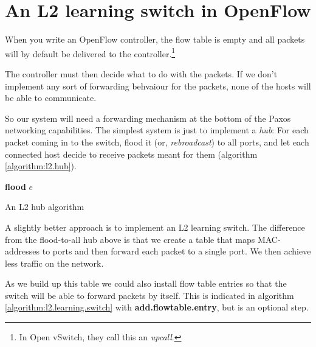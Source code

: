 \section{An L2 learning switch in OpenFlow}
\label{chapter:l2.learning.switch}

When you write an OpenFlow controller, the flow table is empty and all
packets will by default be delivered to the controller.\footnote{In Open
vSwitch, they call this an \textit{upcall}.}

The controller must then decide what to do with the packets.  If we don't
implement any sort of forwarding behvaiour for the packets, none of the
hosts will be able to communicate.

So our system will need a forwarding mechanism at the bottom of the Paxos
networking capabilities.  The simplest system is just to implement a
\textit{hub}:  For each packet coming in to the switch, flood it
(or, \textit{rebroadcast}) to all ports, and let each
connected host decide to receive packets meant for them (algorithm
\ref{algorithm:l2.hub}).

\begin{algorithm}
  \begin{algorithmic}
      \State \textbf{flood} $e$ 
    \EndOn
  \end{algorithmic}
  \caption{An L2 hub algorithm}
  \label{algorithm:l2.hub}
\end{algorithm}

A slightly better approach is to implement an \ac{L2} learning
switch.
The difference from the flood-to-all hub above is that we create a table
that maps MAC-addresses to ports and then forward each packet to a single
port.  We then achieve less traffic on the network.

As we build up this table we could also install flow table entries so that the
switch will be able to forward packets by itself.  This is indicated in
algorithm \vref{algorithm:l2.learning.switch} with
\textbf{add.flowtable.entry}, but is an optional step.

